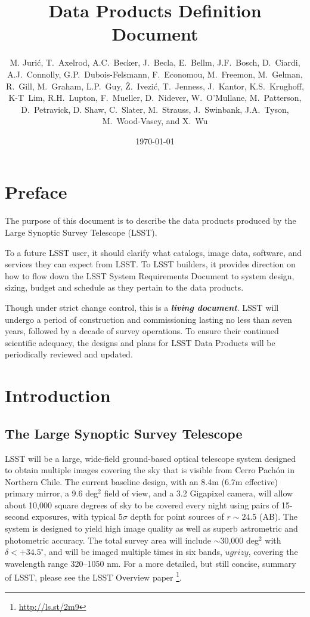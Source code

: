 \documentclass[SE,lsstdraft,toc]{lsstdoc}
\title[DPDD]{Data Products Definition Document}
\author{
M. Juri\'c,
T.~Axelrod, A.C.~Becker, J.~Becla, E.~Bellm, J.F.~Bosch, D.~Ciardi,
A.J.~Connolly,  G.P.~Dubois-Felsmann, F.~Economou, M.~Freemon,
M.~Gelman, R.~Gill, M.~Graham, L.P.~Guy, \v{Z}.~Ivezi\'c, T.~Jenness,  J.~Kantor, K.S.~Krughoff,
K-T~Lim,  R.H.~Lupton, F.~Mueller, D.~Nidever, W.~O'Mullane, M.~Patterson,
D.~Petravick, D. Shaw, C.~Slater, M.~Strauss, J.~Swinbank, J.A.~Tyson, M.~Wood-Vasey, and X.~Wu
}
\date{\today}
\begin{document}
\maketitle

\section*{Preface}

The purpose of this document is to describe the data products produced by the Large Synoptic Survey Telescope (LSST).

To a future LSST user, it should clarify what catalogs, image data, software, and services they can expect from LSST. To LSST builders, it provides direction on how to flow down the LSST System Requirements Document to system design, sizing, budget and schedule as they pertain to the data products.

Though under strict change control, this is a \textbf{\emph{living document}}. LSST will undergo a period of construction  and commissioning lasting no less than seven years, followed by a decade of survey operations. To ensure their continued scientific adequacy, the designs and plans for LSST Data Products will be periodically reviewed and updated.

\clearpage


\section{Introduction}

\subsection{The Large Synoptic Survey Telescope}

LSST will be a large, wide-field ground-based optical telescope system
designed to obtain multiple images covering the sky that is visible from Cerro Pach\'{o}n in Northern Chile. The current baseline design, with an 8.4m (6.7m effective) primary mirror, a 9.6 deg$^2$ field of view, and a 3.2 Gigapixel camera, will allow about 10,000 square degrees of sky to be covered every night using pairs of 15-second exposures, with typical 5$\sigma$ depth for point sources of $r\sim24.5$ (AB). The system is designed to yield high image quality as well as superb astrometric  and photometric accuracy. The total survey area will include $\sim$30,000 deg$^2$ with $\delta<+34.5^\circ$, and will be imaged multiple times in six bands, $ugrizy$, covering the wavelength range 320--1050 nm. For a more detailed, but still concise,
summary of LSST, please see the LSST Overview paper \citep{2008arXiv0805.2366I}\footnote{\url{http://ls.st/2m9}}.
\end{document}
